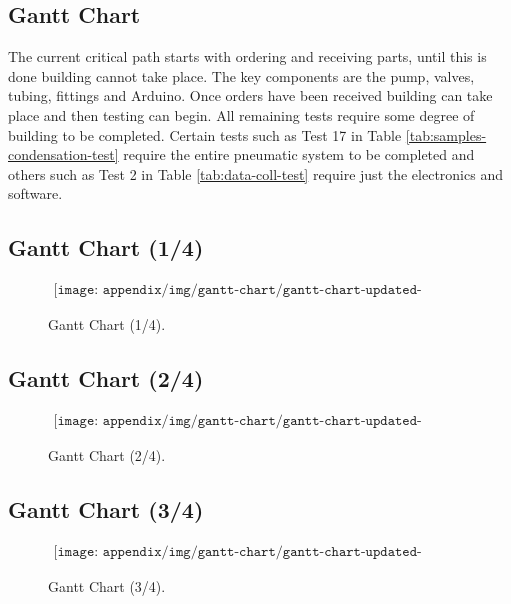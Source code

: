 \begin{landscape}
\section{Gantt Chart} \label{sec:appF}
The current critical path starts with ordering and receiving parts, until this is done building cannot take place. The key components are the pump, valves, tubing, fittings and Arduino. Once orders have been received building can take place and then testing can begin. All remaining tests require some degree of building to be completed. Certain tests such as Test 17 in Table \ref{tab:samples-condensation-test} require the entire pneumatic system to be completed and others such as Test 2 in Table \ref{tab:data-coll-test} require just the electronics and software.


\subsection{Gantt Chart (1/4)}
\begin{figure}[H]
    \begin{align*}
        \texttt{[image: appendix/img/gantt-chart/gantt-chart-updated-part1.png]}
    \end{align*}
    \caption{Gantt Chart (1/4).}
    \label{fig:gantt-chart-1}
\end{figure}

\subsection{Gantt Chart (2/4)}

\begin{figure}[H]
    \begin{align*}
        \texttt{[image: appendix/img/gantt-chart/gantt-chart-updated-part2.png]}
    \end{align*}
    \caption{Gantt Chart (2/4).}
    \label{fig:gantt-chart-2}
\end{figure}


\subsection{Gantt Chart (3/4)}

\begin{figure}[H]
    \begin{align*}
        \texttt{[image: appendix/img/gantt-chart/gantt-chart-updated-part3.png]}
    \end{align*}
    \caption{Gantt Chart (3/4).}
    \label{fig:gantt-chart-3}
\end{figure}



\end{landscape}
